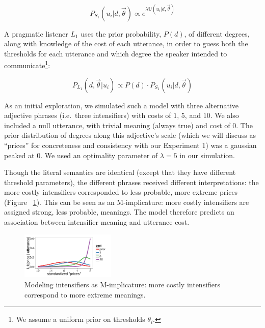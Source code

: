 \documentclass[10pt,letterpaper]{article}
\begin{document}
$$ P_{S_1}(u_i | d, \vec{\theta}) \propto e^{\lambda \mathbb{U}(u_i | d, \vec{\theta})} $$

A pragmatic listener $L_1$ uses the prior probability, $P(d)$, of different degrees, along with knowledge of the cost of each utterance, in order to guess both the thresholds for each utterance and which degree the speaker intended to communicate\footnote{We assume a uniform prior on thresholds $\theta_i$.}:

$$ P_{L_1}(d, \vec{\theta} | u_i) \propto P(d) \cdot P_{S_1}(u_i | d, \vec{\theta}) $$

As an initial exploration, we simulated such a model with three alternative adjective phrases (i.e.~three intensifiers) with costs of $1$, $5$, and $10$. We also included a null utterance, with trivial meaning (always true) and cost of $0$. The prior distribution of degrees along this adjective's scale (which we will discuss as ``prices'' for concreteness and consistency with our Experiment 1) was a gaussian peaked at $0$.
We used an optimality parameter of $\lambda=5$ in our simulation. 

Though the literal semantics are identical (except that they have different threshold parameters), the different phrases received different interpretations: the more costly intensifiers corresponded to less probable, more extreme prices (Figure ~\ref{model}). This can be seen as an M-implicature: more costly intensifiers are assigned strong, less probable, meanings. 
The model therefore predicts an association between intensifier meaning and utterance cost.

\begin{figure}[ht]
\begin{center}
\includegraphics[width=0.4\textwidth]{model_results.pdf}
\end{center}
\caption{Modeling intensifiers as M-implicature: more costly intensifiers correspond to more extreme meanings.} 
\label{model}
\end{figure}




\setlength{\bibleftmargin}{.125in}
\setlength{\bibindent}{-\bibleftmargin}


\end{document}
